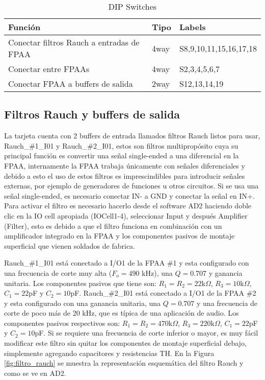 	\begin{table}[!ht]
		\centering
		\begin{tabular}{|l|l|l|}
			\hline
			\textbf{Función} &  \textbf{Tipo} & \textbf{Labels}\\
			\hline
			Conectar filtros Rauch a entradas de FPAA 					& 4way 		& S8,9,10,11,15,16,17,18		\\
			\hline
			Conectar entre FPAAs 										& 4way 		& S2,3,4,5,6,7					\\
			\hline
			Conectar FPAA a buffers de salida 							& 2way 		& S12,13,14,19					\\
			\hline
		\end{tabular}
		\caption{DIP Switches}
		\label{tab:switches}
	\end{table}

		\subsection{Filtros Rauch y buffers de salida}
	
	La tarjeta cuenta con 2 buffers de entrada llamados filtros Rauch listos para usar, Rauch\_\#1\_I01 y Rauch\_\#2\_I01, estos son filtros multipropósito cuya su principal función es convertir una señal single-ended a una diferencial en la FPAA, internamente la FPAA trabaja únicamente con señales diferenciales y debido a esto el uso de estos filtros es imprescindibles para introducir señales externas, por ejemplo de generadores de funciones u otros circuitos. Si se usa una señal single-ended, es necesario conectar IN- a GND y conectar la señal en IN+.
	Para activar el filtro es necesario hacerlo desde el software AD2 haciendo doble clic en la IO cell apropiada (IOCell1-4), seleccionar Input y después Amplifier (Filter), esto es debido a que el filtro funciona en combinación con un amplificador integrado en la FPAA y los componentes pasivos de montaje superficial que vienen soldados de fabrica.
	
	Rauch\_\#1\_I01 está conectado a I/O1 de la FPAA \#1 y esta configurado con una frecuencia de corte muy alta ($F_{o} = 490$ kHz), una $Q = 0.707$ y ganancia unitaria. Los componentes pasivos que tiene son: $R_{1} = R_{2} = 22$k$\Omega$, $R_{3} = 10$k$\Omega$, $C_{1} = 22$pF y $C_{2} = 10$pF.  Rauch\_\#2\_I01 está conectado a I/O1 de la FPAA \#2 y esta configurado con una ganancia unitaria, una $Q = 0.707$ y una frecuencia de corte de poco más de 20 kHz, que es típica de una aplicación de audio. Los componentes pasivos respectivos son: $R_{1} = R_{2} = 470$k$\Omega$, $R_{3} = 220$k$\Omega$, $C_{1} = 22$pF y $C_{2} = 10$pF. Si se requiere una frecuencia de corte inferior o mayor, es muy fácil modificar este filtro sin quitar los componentes de montaje superficial debajo, simplemente agregando capacitores y resistencias TH. En la Figura \ref{fig:filtro_rauch} se muestra la representación esquemática del filtro Rauch y como se ve en AD2.
	
